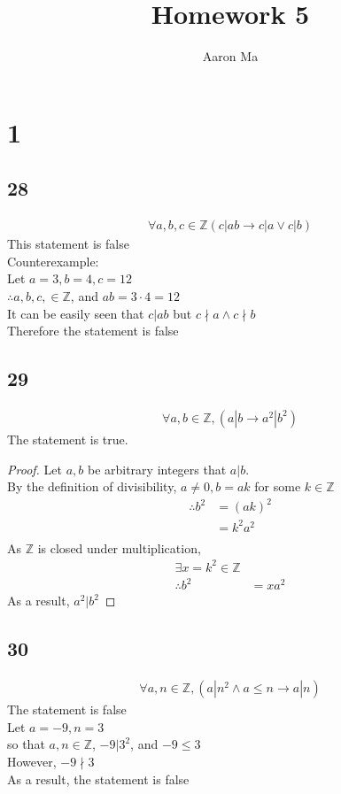 \documentclass{article}
\title{Homework 5}
\author{Aaron Ma}
\begin{document}
\maketitle
\section{1}
\subsection{28}
\begin{align*}
    \forall a,b,c \in \mathbb{Z}(c|ab \rightarrow c|a \vee c|b)
\end{align*}
This statement is false\\
Counterexample:\\
Let $a = 3, b = 4, c = 12$\\
$\therefore a,b,c, \in \mathbb{Z}$, and $ab = 3 \cdot 4 = 12$\\
It can be easily seen that $c|ab$ but $c \nmid a \wedge c \nmid b$\\
Therefore the statement is false
\subsection{29}
\begin{align*}
    \forall a,b\in \mathbb{Z}, (a|b \rightarrow a^2|b^2)
\end{align*}
The statement is true.\\
\begin{proof}
    Let $a,b$ be arbitrary integers that $a|b$.\\
    By the definition of divisibility, $a \neq 0, b = ak$ for some $k \in \mathbb{Z}$\\
    \begin{align*}
        \therefore b^2 &= (ak)^2 \tag{By substitution} \\
        &= k^2a^2\tag{By algebra}\\
    \end{align*}
    As $\mathbb{Z}$ is closed under multiplication,\\
    \begin{align*}
        \exists x = k^2 \in \mathbb{Z}\\
        \therefore b^2 &= xa^2
    \end{align*}
    As a result, $a^2|b^2$
    
\end{proof}

\subsection{30}
\begin{align*}
    \forall a,n \in \mathbb{Z}, (a|n^2 \wedge a \leq n \rightarrow a|n)
\end{align*}
The statement is false\\
Let $a = -9, n = 3$\\
so that $a,n\in \mathbb{Z}$, $-9|3^2$, and $-9 \leq 3$\\
However, $-9 \nmid 3$\\
As a result, the statement is false\\
\end{document}
